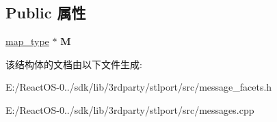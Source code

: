 \subsection*{Public 属性}
\begin{DoxyCompactItemize}
\item 
\mbox{\label{struct___catalog__locale__map_a111a8f8afe2683f5f103dd10dc976256}} 
\hyperlink{classhash__map}{map\+\_\+type} $\ast$ {\bfseries M}
\end{DoxyCompactItemize}


该结构体的文档由以下文件生成\+:\begin{DoxyCompactItemize}
\item 
E\+:/\+React\+O\+S-\/0../sdk/lib/3rdparty/stlport/src/message\+\_\+facets.\+h\item 
E\+:/\+React\+O\+S-\/0../sdk/lib/3rdparty/stlport/src/messages.\+cpp\end{DoxyCompactItemize}
